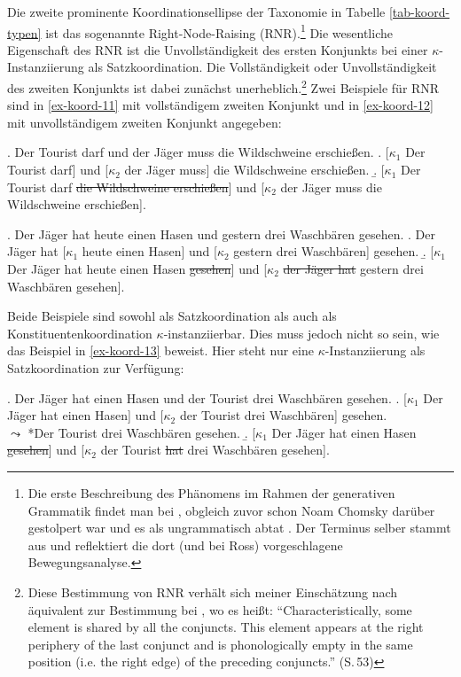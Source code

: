 Die zweite prominente Koordinationsellipse der Taxonomie in Tabelle \ref{tab-koord-typen} ist das sogenannte Right-Node-Raising (RNR).\footnote{Die erste Beschreibung des Phänomens im Rahmen der generativen Grammatik findet man bei \citet[174ff]{Ross:67}, obgleich zuvor schon Noam Chomsky darüber gestolpert war und es als ungrammatisch abtat \citep[35, Fußnote 2]{Chomsky:57}. Der Terminus selber stammt aus \cite{Postal:74} und reflektiert die dort (und bei Ross) vorgeschlagene Bewegungsanalyse.} Die wesentliche Eigenschaft des RNR ist die Unvollständigkeit des ersten Konjunkts bei einer $\kappa$-Instanziierung als Satzkoordination. Die Vollständigkeit oder Unvollständigkeit des zweiten Konjunkts ist dabei zunächst unerheblich.\footnote{Diese Bestimmung von RNR verhält sich meiner Einschätzung nach äquivalent zur Bestimmung bei \cite{Hartmann:00}, wo es hei\ss t: "`Characteristically, some element is shared by all the conjuncts. This element appears at the right periphery of the last conjunct and is phonologically empty in the same position (i.e. the right edge) of the preceding conjuncts."' (S.\,53)} Zwei Beispiele für RNR sind in \ref{ex-koord-11} mit vollständigem zweiten Konjunkt und in \ref{ex-koord-12} mit unvollständigem zweiten Konjunkt angegeben: 

\exi. \label{ex-koord-11} Der Tourist darf und der J\"ager muss die Wildschweine erschie\ss en.
\a. [$\kappa_1$ Der Tourist darf] und [$\kappa_2$ der J\"ager muss] die Wildschweine erschie\ss en.
\b. [$\kappa_1$ Der Tourist darf \sout{die Wildschweine erschie\ss en}] und [$\kappa_2$ der J\"ager muss die Wildschweine erschie\ss en].

\exi. \label{ex-koord-12} Der J\"ager hat heute einen Hasen und gestern drei Waschb\"aren gesehen.
\a. Der J\"ager hat [$\kappa_1$ heute einen Hasen] und [$\kappa_2$ gestern drei Waschb\"aren] gesehen.
\b. [$\kappa_1$ Der J\"ager hat heute einen Hasen \sout{gesehen}] und [$\kappa_2$ \sout{der Jäger hat}  gestern drei Waschb\"aren gesehen].

Beide Beispiele sind sowohl als Satzkoordination als auch als Konstituentenkoordination $\kappa$-instanziierbar. Dies muss jedoch nicht so sein, wie das Beispiel in \ref{ex-koord-13} beweist. Hier steht nur eine $\kappa$-Instanziierung als Satzkoordination zur Verfügung:\largerpage%

\ex. \label{ex-koord-13}Der Jäger hat einen Hasen und der Tourist drei Waschbären gesehen.
\a. [$\kappa_1$ Der Jäger hat einen Hasen] und [$\kappa_2$ der Tourist drei Waschbären] gesehen. \\
$\leadsto$ *Der Tourist drei Waschbären gesehen.
\b. [$\kappa_1$ Der Jäger hat einen Hasen \sout{gesehen}] und [$\kappa_2$ der Tourist \sout{hat} drei Waschbären gesehen].
 
